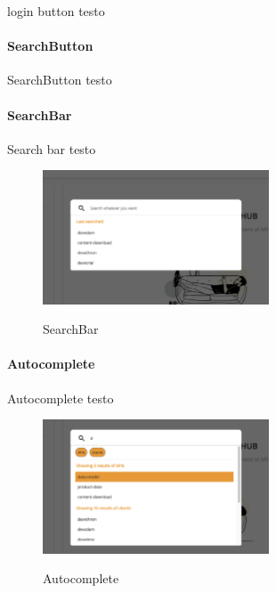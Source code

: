 login button testo

\paragraph{SearchButton}\label{par:search-button}

SearchButton testo

\paragraph{SearchBar}\label{par:search-bar}

Search bar testo

\begin{figure}[ht]
  \centering
  \includegraphics[width=0.6\textwidth, alt={Barra di ricerca globale dell'applicazione}]{images/frontend/SearchBar.jpg}
  \caption{SearchBar}\label{fig:search-bar}
\end{figure}

\paragraph{Autocomplete}\label{par:autocomplete}

Autocomplete testo

\begin{figure}[ht]
  \centering
  \includegraphics[width=0.6\textwidth, alt={Componente che si occupa della lista dinamica di risultati}]{images/frontend/SearchBar2.jpg}
  \caption{Autocomplete}\label{fig:autocomplete}
\end{figure}

